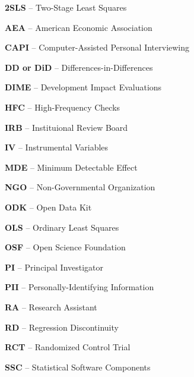 \noindent\textbf{2SLS} -- Two-Stage Least Squares

\noindent\textbf{AEA} -- American Economic Association

\noindent\textbf{CAPI} -- Computer-Assisted Personal Interviewing

\noindent\textbf{DD or DiD} -- Differences-in-Differences

\noindent\textbf{DIME} -- Development Impact Evaluations

\noindent\textbf{HFC} -- High-Frequency Checks

\noindent\textbf{IRB} -- Instituional Review Board

\noindent\textbf{IV} -- Instrumental Variables

\noindent\textbf{MDE} -- Minimum Detectable Effect

\noindent\textbf{NGO} -- Non-Governmental Organization

\noindent\textbf{ODK} -- Open Data Kit

\noindent\textbf{OLS} -- Ordinary Least Squares

\noindent\textbf{OSF} -- Open Science Foundation

\noindent\textbf{PI} -- Principal Investigator

\noindent\textbf{PII} -- Personally-Identifying Information

\noindent\textbf{RA} -- Research Assistant

\noindent\textbf{RD} -- Regression Discontinuity

\noindent\textbf{RCT} -- Randomized Control Trial

\noindent\textbf{SSC} -- Statistical Software Components

